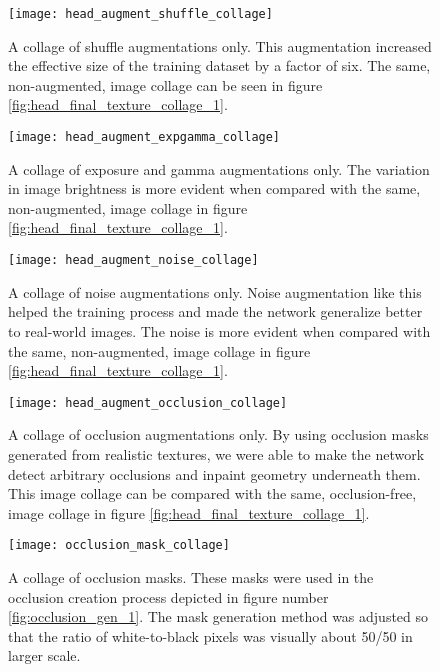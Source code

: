 \begin{figure}
    \texttt{[image: head\_augment\_shuffle\_collage]}
    \caption[Shuffle augmentation collage]{A collage of shuffle augmentations only. This augmentation increased the effective size of the training dataset by a factor of six. The same, non-augmented, image collage can be seen in figure \ref{fig:head_final_texture_collage_1}.}
    \label{fig:head_augment_shuffle_collage_1}
\end{figure}

\begin{figure}
    \texttt{[image: head\_augment\_expgamma\_collage]}
    \caption[Exposure and gamma augmentation collage]{A collage of exposure and gamma augmentations only. The variation in image brightness is more evident when compared with the same, non-augmented, image collage in figure \ref{fig:head_final_texture_collage_1}.}
    \label{fig:head_augment_expgamma_collage_1}
\end{figure}

\begin{figure}
    \texttt{[image: head\_augment\_noise\_collage]}
    \caption[Noise augmentation collage]{A collage of noise augmentations only. Noise augmentation like this helped the training process and made the network generalize better to real-world images. The noise is more evident when compared with the same, non-augmented, image collage in figure \ref{fig:head_final_texture_collage_1}.}
    \label{fig:head_augment_noise_collage_1}
\end{figure}

\begin{figure}
    \texttt{[image: head\_augment\_occlusion\_collage]}
    \caption[Occlusion augmentation collage]{A collage of occlusion augmentations only. By using occlusion masks generated from realistic textures, we were able to make the network detect arbitrary occlusions and inpaint geometry underneath them. This image collage can be compared with the same, occlusion-free, image collage in figure \ref{fig:head_final_texture_collage_1}.}
    \label{fig:head_augment_occlusion_collage_1}
\end{figure}

\begin{figure}
    \texttt{[image: occlusion\_mask\_collage]}
    \caption[Occlusion mask collage]{A collage of occlusion masks. These masks were used in the occlusion creation process depicted in figure number \ref{fig:occlusion_gen_1}. The mask generation method was adjusted so that the ratio of white-to-black pixels was visually about 50/50 in larger scale.}
    \label{fig:occlusion_mask_collage_1}
\end{figure}
